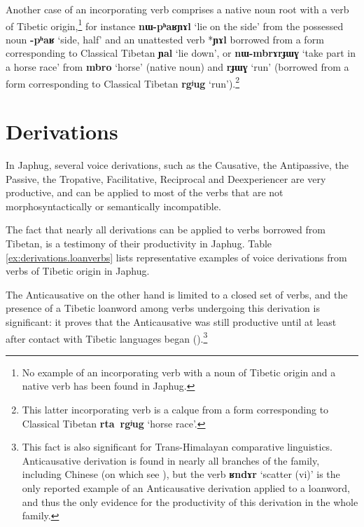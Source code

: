 \documentclass[oneside,a4paper,11pt]{article}
\newcommand{\ipa}[1]{{\phon\textbf{\mbox{#1}}}} %
\begin{document}
Another case of an incorporating verb comprises a native noun root with a verb of Tibetic origin,\footnote{No example of an incorporating verb with a noun of Tibetic origin and a native verb has been found in Japhug.} for instance  \ipa{nɯ-pʰaʁɲɤl} `lie on the side' from the possessed noun \ipa{-pʰaʁ} `side, half' and an unattested verb *\ipa{ɲɤl} borrowed from a form corresponding to Classical Tibetan \ipa{ɲal} `lie down', or \ipa{nɯ-mbrɤrɟɯɣ} `take part in a horse race' from \ipa{mbro} `horse' (native noun) and \ipa{rɟɯɣ} `run' (borrowed from a form corresponding to Classical Tibetan \ipa{rgʲug} `run').\footnote{This latter incorporating verb is a calque from a form corresponding to Classical Tibetan \ipa{rta rgʲug} `horse race'.}
  
\section{Derivations}
In Japhug, several voice derivations, such as the Causative, the Antipassive, the Passive, the Tropative, Facilitative, Reciprocal and Deexperiencer are very productive, and can be applied to most of the verbs that are not morphosyntactically or semantically incompatible. 


The fact that nearly all derivations can be applied to verbs borrowed from Tibetan, is a testimony of their productivity in Japhug. Table \ref{ex:derivations.loanverbs} lists representative examples of voice derivations from verbs of Tibetic origin in Japhug.

The Anticausative on the other hand is limited to a closed set of verbs, and the presence of a Tibetic loanword among verbs undergoing this derivation is significant: it proves that the Anticausative was still productive until at least after contact with Tibetic languages began (\citealt{jacques12demotion}).\footnote{This fact is also significant for Trans-Himalayan comparative linguistics. Anticausative derivation is found in nearly all branches of the family, including Chinese (on which see \citealt{sagart12sprefix}), but the verb \ipa{ʁndɤr} `scatter (vi)' is the only reported example of an Anticausative derivation applied to a loanword, and thus the only evidence for the productivity of this derivation in the whole family. }
\end{document}
